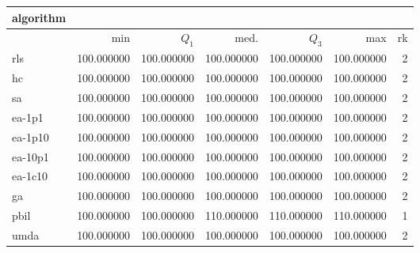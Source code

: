 \begin{tabular}{@{}l*{5}{>{{}}N{3}{0}}>{{}}N{2}{0}@{}}
\toprule
{algorithm} &  \\
\midrule
& {min} & {$Q_1$} & {med.} & {$Q_3$} & {max} & {rk}\\
\midrule
rls & {\color{blue}} 100.000000 & {\color{blue}} 100.000000 & 100.000000 & 100.000000 & 100.000000 & 2\\
hc & {\color{blue}} 100.000000 & {\color{blue}} 100.000000 & 100.000000 & 100.000000 & 100.000000 & 2\\
sa & {\color{blue}} 100.000000 & {\color{blue}} 100.000000 & 100.000000 & 100.000000 & 100.000000 & 2\\
ea-1p1 & {\color{blue}} 100.000000 & {\color{blue}} 100.000000 & 100.000000 & 100.000000 & 100.000000 & 2\\
ea-1p10 & {\color{blue}} 100.000000 & {\color{blue}} 100.000000 & 100.000000 & 100.000000 & 100.000000 & 2\\
ea-10p1 & {\color{blue}} 100.000000 & {\color{blue}} 100.000000 & 100.000000 & 100.000000 & 100.000000 & 2\\
ea-1c10 & {\color{blue}} 100.000000 & {\color{blue}} 100.000000 & 100.000000 & 100.000000 & 100.000000 & 2\\
ga & {\color{blue}} 100.000000 & {\color{blue}} 100.000000 & 100.000000 & 100.000000 & 100.000000 & 2\\
pbil & {\color{blue}} 100.000000 & {\color{blue}} 100.000000 & {\color{blue}} 110.000000 & {\color{blue}} 110.000000 & {\color{blue}} 110.000000 & 1\\
umda & {\color{blue}} 100.000000 & {\color{blue}} 100.000000 & 100.000000 & 100.000000 & 100.000000 & 2\\
\bottomrule
\end{tabular}
